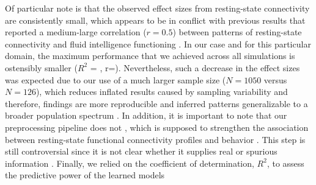 \documentclass[10pt,letterpaper]{article}
\begin{document}
Of particular note is that the observed effect sizes from resting-state connectivity are consistently small, which appears to be in conflict with previous results that reported a medium-large correlation ($r=0.5$) between patterns of resting-state connectivity and fluid intelligence functioning \cite{finn_functional_2015}. In our case and for this particular domain, the maximum performance that we achieved across all simulations is ostensibly smaller ($R^2$ = , r=). Nevertheless, such a decrease in the effect sizes was expected due to our use of a much larger sample size ($N=1050$ versus $N=126$), which reduces inflated results caused by sampling variability and therefore, findings are more reproducible and inferred patterns generalizable to a broader population spectrum \cite{Marek2020.08.21.257758}. In addition, it is important to note that our preprocessing pipeline does not , which is supposed to  {strengthen the association between resting-state functional connectivity profiles and behavior} \cite{LI2019126}. This step is still controversial since it is not clear whether it supplies real or spurious information \cite{MURPHY2017169}. Finally, we relied on the coefficient of determination, $R^2$, to assess the predictive power of the learned models %
\end{document}
